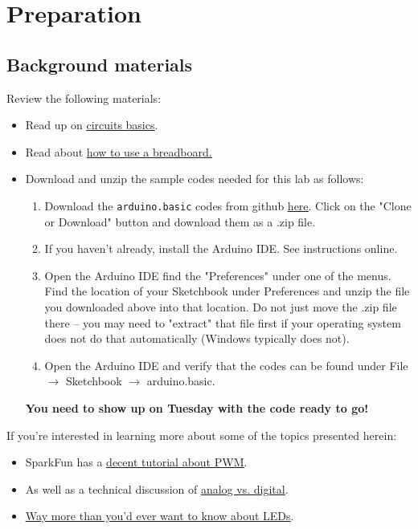 \documentclass[11pt]{article} %
\begin{document}
\section*{Preparation}
\subsection*{Background materials}

Review the following materials:
\begin{itemize}
\item Read up on \href{https://learn.sparkfun.com/tutorials/what-is-a-circuit}{\underline{circuits basics}}. 
\item Read about \href{https://learn.sparkfun.com/tutorials/how-to-use-a-breadboard}{\underline{how to use a breadboard.}}
\item Download and unzip the sample codes needed for this lab as follows:
\begin{enumerate}
\item Download the \verb|arduino.basic| codes from github \href{https://github.com/gcl8a/arduino.basic}{\underline{here}}. Click on the "Clone or Download" button and download them as a .zip file.
\item If you haven't already, install the Arduino IDE. See instructions online.
\item Open the Arduino IDE find the "Preferences" under one of the menus. Find the location of your Sketchbook under Preferences and unzip the file you downloaded above into that location. Do not just move the .zip file there -- you may need to "extract" that file first if your operating system does not do that automatically (Windows typically does not).
\item Open the Arduino IDE and verify that the codes can be found under File $\rightarrow$ Sketchbook $\rightarrow$ arduino.basic.
\end{enumerate}
\textbf{You need to show up on Tuesday with the code ready to go!}
\end{itemize}

If you’re interested in learning more about some of the topics presented herein:
\begin{itemize}
    \item SparkFun has a \href{https://learn.sparkfun.com/tutorials/pulse-width-modulation}{\underline{decent tutorial about PWM}}.
    \item As well as a technical discussion of \href{https://learn.sparkfun.com/tutorials/analog-vs-digital}{\underline{analog vs. digital}}.
    \item \href{https://learn.sparkfun.com/tutorials/light-emitting-diodes-leds}{\underline{Way more than you'd ever want to know about LEDs}}.
\end{itemize}
\end{document}
